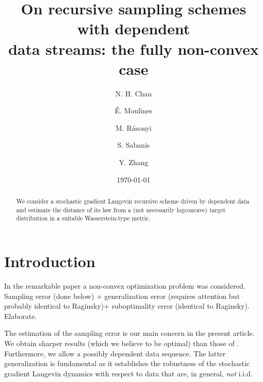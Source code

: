 \documentclass[a4paper,draft]{article}
\begin{document}
\title{On recursive sampling schemes with dependent\\ data streams:
the fully non-convex case
\footnotemark[1]}

\author{N. H. Chau\footnotemark[3] \and \'E. Moulines\footnotemark[4] \and
M. R\'asonyi\footnotemark[3] \and S. Sabanis\footnotemark[2] \and Y. Zhang\footnotemark[2]}

\renewcommand{\thefootnote}{\fnsymbol{footnote}}


\date{\today}

\maketitle

\begin{abstract}
We consider a stochastic gradient Langevin recursive scheme driven by
dependent data and estimate the distance of its law from a (not necessarily logconcave) 
target distribution in a suitable Wasserstein-type metric.
\end{abstract}

\section{Introduction}

In the remarkable paper \cite{raginsky} a non-convex optimization problem was considered.
Sampling error (done below) + generalization error (requires attention but probably
identical to Raginsky)+ suboptimality error (identical to Raginsky). Elaborate.

The estimation of the sampling error is our main concern in the present article. We 
obtain sharper results (which we believe to be optimal) than those of \cite{raginsky}.
Furthermore, we allow a possibly dependent data sequence. The latter generalization is fundamental
as it establishes the robustness of the stochastic gradient Langevin dynamics with respect to
data that are, in general, \emph{not} i.i.d.
\end{document}
